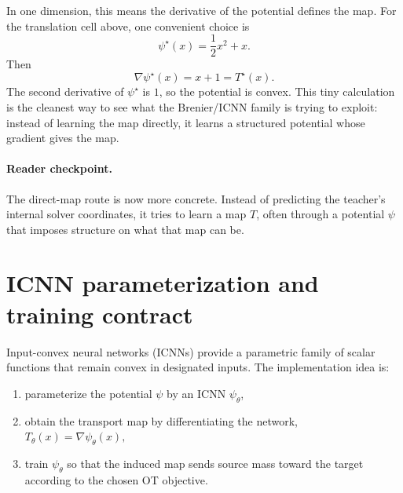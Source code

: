 In one dimension, this means the derivative of the potential defines the map.
For the translation cell above, one convenient choice is
\begin{equation}
\label{eq:bf-neural-ot-direct-brenier-example}
  \psi^\star(x)=\frac{1}{2}x^2+x.
\end{equation}
Then
\begin{equation}
\label{eq:bf-neural-ot-direct-brenier-example-grad}
  \nabla\psi^\star(x)=x+1=T^\star(x).
\end{equation}
The second derivative of \(\psi^\star\) is \(1\), so the potential is convex.
This tiny calculation is the cleanest way to see what the Brenier/ICNN family is
trying to exploit: instead of learning the map directly, it learns a structured
potential whose gradient gives the map.

\paragraph{Reader checkpoint.}
The direct-map route is now more concrete.  Instead of predicting the teacher’s
internal solver coordinates, it tries to learn a map \(T\), often through a
potential \(\psi\) that imposes structure on what that map can be.

\section{ICNN parameterization and training contract}
\label{sec:bf-neural-ot-direct-icnn}

Input-convex neural networks (ICNNs) provide a parametric family of scalar
functions that remain convex in designated inputs.  The implementation idea is:
\begin{enumerate}[label=(\roman*)]
  \item parameterize the potential \(\psi\) by an ICNN \(\psi_\theta\),
  \item obtain the transport map by differentiating the network,
  \(
    T_\theta(x)=\nabla\psi_\theta(x),
  \)
  \item train \(\psi_\theta\) so that the induced map sends source mass toward the
  target according to the chosen OT objective.
\end{enumerate}

